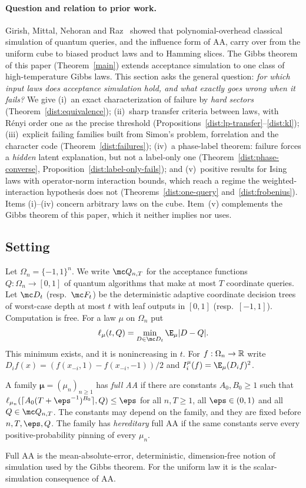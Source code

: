 \paragraph{Question and relation to prior work.}
Girish, Mittal, Nehoran and Raz~\cite{GMNR26} showed that polynomial-overhead
classical simulation of quantum queries, and the influence form of AA, carry
over from the uniform cube to biased product laws and to Hamming slices. The
Gibbs theorem of this paper (Theorem~\ref{main}) extends acceptance simulation to
one class of high-temperature Gibbs laws. This section asks the general
question: \emph{for which input laws does acceptance simulation hold, and what
exactly goes wrong when it fails?} We give
(i)~an exact characterization of failure by \emph{hard sectors}
(Theorem~\ref{dist:equivalence});
(ii)~sharp transfer criteria between laws, with Rényi order one as the precise
threshold (Propositions~\ref{dist:lp-transfer}--\ref{dist:kl});
(iii)~explicit failing families built from Simon's problem, forrelation and the
character code (Theorem~\ref{dist:failures});
(iv)~a phase-label theorem: failure forces a \emph{hidden} latent explanation,
but not a label-only one (Theorem~\ref{dist:phase-converse},
Proposition~\ref{dist:label-only-fails}); and
(v)~positive results for Ising laws with operator-norm interaction bounds,
which reach a regime the weighted-interaction hypothesis does not
(Theorems~\ref{dist:one-query} and~\ref{dist:frobenius}).
Items (i)--(iv) concern arbitrary laws on the cube. Item~(v) complements the
Gibbs theorem of this paper, which it neither implies nor uses.

\subsection{Setting}\label{dist:setting}
Let \(\Omega_n=\{-1,1\}^n\). We write \(\mc Q_{n,T}\) for the acceptance
functions \(Q:\Omega_n\to[0,1]\) of quantum algorithms that make at most \(T\)
coordinate queries. Let \(\mc D_t\) (resp.\ \(\mc F_t\)) be the deterministic
adaptive coordinate decision trees of worst-case depth at most \(t\) with leaf
outputs in \([0,1]\) (resp.\ \([-1,1]\)). Computation is free. For a law \(\mu\)
on \(\Omega_n\) put
\[
 \ell_\mu(t,Q)=\min_{D\in\mc D_t}\E_\mu|D-Q| .
\]
This minimum exists, and it is nonincreasing in \(t\). For
\(f:\Omega_n\to\mathbb R\) write \(D_if(x)=(f(x_{-i},1)-f(x_{-i},-1))/2\) and
\(I_i^\mu(f)=\E_\mu(D_if)^2\).

\begin{definition}[Full AA]\label{dist:full-aa}
A family \(\boldsymbol\mu=(\mu_n)_{n\ge1}\) has \emph{full AA} if there are
constants \(A_0,B_0\ge1\) such that
\(\ell_{\mu_n}(\lceil A_0(T+\eps^{-1})^{B_0}\rceil,Q)\le\eps\) for all
\(n,T\ge1\), all \(\eps\in(0,1)\) and all \(Q\in\mc Q_{n,T}\). The constants may
depend on the family, and they are fixed before \(n,T,\eps,Q\). The family has
\emph{hereditary} full AA if the same constants serve every positive-probability
pinning of every \(\mu_n\).
\end{definition}
Full AA is the mean-absolute-error, deterministic, dimension-free notion of
simulation used by the Gibbs theorem. For the uniform law it is the
scalar-simulation consequence of AA.

